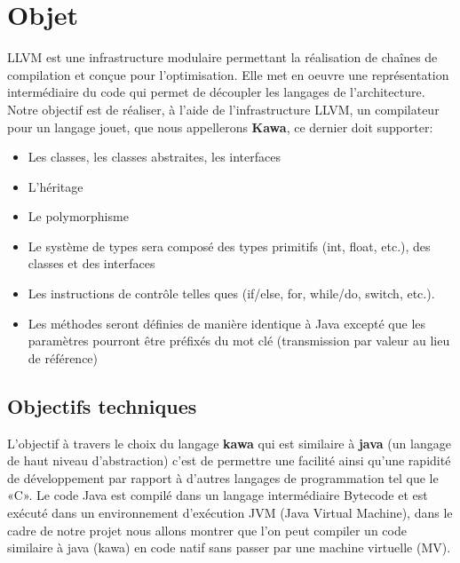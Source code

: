 \documentclass{../res/univ-projet}
\begin{document}
\maketitle
\newpage
\tableofcontents
\newpage

\section{Objet}

LLVM est une infrastructure modulaire permettant la réalisation de
chaînes de compilation et conçue pour l'optimisation. Elle met en oeuvre
une représentation intermédiaire du code qui permet de découpler les
langages de l'architecture. Notre objectif est de réaliser, à l'aide de
l'infrastructure LLVM, un compilateur pour un langage jouet, que nous
appellerons \textbf {Kawa}, ce dernier doit supporter:
 \begin{itemize}
 	\item	Les classes, les classes abstraites, les interfaces
	\item   L'héritage
	\item   Le polymorphisme
	\item   Le système de types sera composé des types primitifs
	  (int, float, etc.), des classes et des interfaces
	\item   Les instructions de contrôle telles ques (if/else, for,
	  while/do, switch, etc.).
	\item   Les méthodes seront définies de manière identique à Java
	  excepté que les paramètres pourront être préfixés du mot clé
	   (transmission par valeur au lieu de référence)
 \end{itemize}


\subsection{Objectifs techniques}
L'objectif à travers le choix du langage \textbf {kawa} qui est similaire  à \textbf {java} (un langage de haut niveau d'abstraction) c'est de permettre une facilité ainsi qu'une rapidité de développement par rapport à d'autres langages de programmation tel que le «C». Le code Java  est compilé dans un langage intermédiaire  Bytecode et est exécuté dans un environnement d'exécution JVM (Java Virtual Machine), dans le cadre de notre projet nous allons montrer que l'on peut compiler un code similaire à java (kawa) en code natif sans passer par une machine virtuelle (MV).
\end{document}
